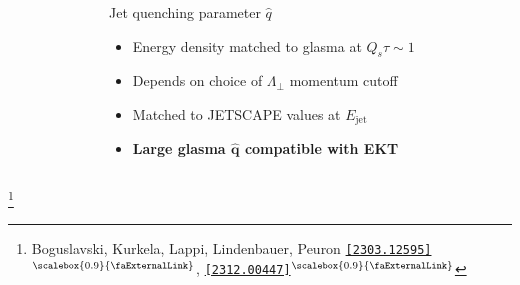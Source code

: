 \documentclass[aspectratio=169,11pt,usenames,dvipsnames]{beamer}
\renewcommand{\thefootnote}{\color{customblue}\faPaperPlaneO}
\newcommand\blfootnote[1]{%
  \begingroup
  \renewcommand\thefootnote{}\footnote{#1}%
  \addtocounter{footnote}{-1}%
  \endgroup
}
\begin{document}
\begin{frame}[t]
\begin{columns}[onlytextwidth,t]
\begin{figure}
        \end{figure}
        \begin{center}
            {\Large\color{isgold} Jet quenching parameter $\hat{q}$\\[10pt]}
            \footnotesize
                \begin{itemize}
                    \item {\color{lightgray}Energy density matched to glasma at $Q_s\tau\sim 1$}
                    \item {\color{lightgray}Depends on choice of $\Lambda_\perp$ momentum cutoff}
                    \item {\color{lightgray}Matched to JETSCAPE values at $E_\mathrm{jet}$}\\[15pt]
                    \item {\color{destacado}\bfseries\normalsize{Large glasma $\boldsymbol{\hat{q}}$ compatible with EKT}}
                \end{itemize}
        \end{center}
    \end{columns}
    \blfootnote{\scriptsize Boguslavski, Kurkela, Lappi, Lindenbauer, Peuron \href{https://arxiv.org/abs/2303.12595}{{\color{isgold}\texttt{[2303.12595]}$^\text{\scalebox{0.9}{\faExternalLink}}$}}, \href{https://arxiv.org/abs/2312.00447}{{\color{isgold}\texttt{[2312.00447]}$^\text{\scalebox{0.9}{\faExternalLink}}$}}}
\end{frame}

\end{document}
